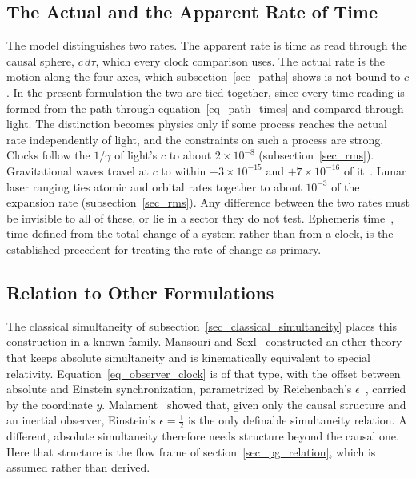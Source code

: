 \documentclass{iopjournal}
\begin{document}
\subsection{The Actual and the Apparent Rate of Time}\label{sec_two_rates}

The model distinguishes two rates. The apparent rate is time as read through the causal sphere, $c\,d\tau$, which every clock comparison uses. The actual rate is the motion along the four axes, which subsection~\ref{sec_paths} shows is not bound to $c$. In the present formulation the two are tied together, since every time reading is formed from the path through equation~\eqref{eq_path_times} and compared through light. The distinction becomes physics only if some process reaches the actual rate independently of light, and the constraints on such a process are strong. Clocks follow the $1/\gamma$ of light's $c$ to about $2\times10^{-8}$ (subsection~\ref{sec_rms}). Gravitational waves travel at $c$ to within $-3\times10^{-15}$ and $+7\times10^{-16}$ of it~\cite{GW170817GRB}. Lunar laser ranging ties atomic and orbital rates together to about $10^{-3}$ of the expansion rate (subsection~\ref{sec_rms}). Any difference between the two rates must be invisible to all of these, or lie in a sector they do not test. Ephemeris time~\cite{Barbour2009}, time defined from the total change of a system rather than from a clock, is the established precedent for treating the rate of change as primary.

\subsection{Relation to Other Formulations}\label{sec_relation}

The classical simultaneity of subsection~\ref{sec_classical_simultaneity} places this construction in a known family. Mansouri and Sexl~\cite{MansouriSexl1977} constructed an ether theory that keeps absolute simultaneity and is kinematically equivalent to special relativity. Equation~\eqref{eq_observer_clock} is of that type, with the offset between absolute and Einstein synchronization, parametrized by Reichenbach's $\epsilon$~\cite{Reichenbach1958}, carried by the coordinate $y$. Malament~\cite{Malament1977} showed that, given only the causal structure and an inertial observer, Einstein's $\epsilon=\tfrac12$ is the only definable simultaneity relation. A different, absolute simultaneity therefore needs structure beyond the causal one. Here that structure is the flow frame of section~\ref{sec_pg_relation}, which is assumed rather than derived.
\end{document}
